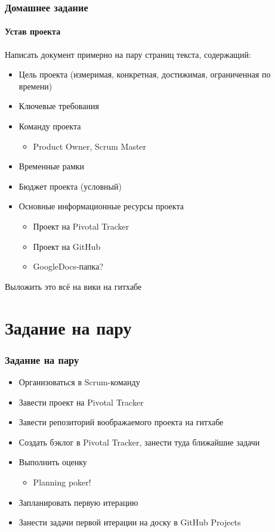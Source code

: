\documentclass[xetex,mathserif,serif]{beamer}
\begin{document}
	\begin{frame}
		\frametitle{Домашнее задание}
		\framesubtitle{Устав проекта}
		Написать документ примерно на пару страниц текста, содержащий:
		\begin{itemize}
			\item Цель проекта (измеримая, конкретная, достижимая, ограниченная по времени)
			\item Ключевые требования
			\item Команду проекта
			\begin{itemize}
				\item Product Owner, Scrum Master
			\end{itemize}
			\item Временные рамки
			\item Бюджет проекта (условный)
			\item Основные информационные ресурсы проекта
			\begin{itemize}
				\item Проект на Pivotal Tracker
				\item Проект на GitHub
				\item GoogleDocs-папка?
			\end{itemize}
		\end{itemize}
		Выложить это всё на вики на гитхабе
	\end{frame}

	\section{Задание на пару}

	\begin{frame}
		\frametitle{Задание на пару}
		\begin{itemize}
			\item Организоваться в Scrum-команду
			\item Завести проект на Pivotal Tracker
			\item Завести репозиторий воображаемого проекта на гитхабе
			\item Создать бэклог в Pivotal Tracker, занести туда ближайшие задачи
			\item Выполнить оценку
			\begin{itemize}
				\item Planning poker!
			\end{itemize}
			\item Запланировать первую итерацию
			\item Занести задачи первой итерации на доску в GitHub Projects
		\end{itemize}
	\end{frame}
\end{document}
